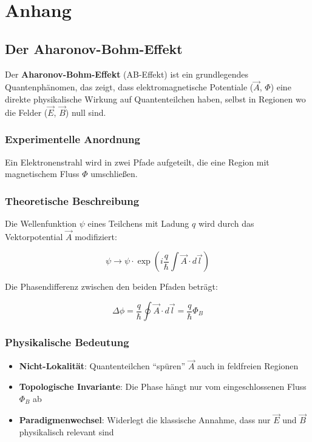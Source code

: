 \chapter{Anhang}
\section{Der Aharonov-Bohm-Effekt}
\label{sec:aharonov-bohm}

Der \textbf{Aharonov-Bohm-Effekt} (AB-Effekt) ist ein grundlegendes Quantenphänomen, das zeigt, dass elektromagnetische Potentiale ($\vec{A}$, $\Phi$) eine direkte physikalische
Wirkung auf Quantenteilchen haben, selbst in Regionen wo die Felder ($\vec{E}$, $\vec{B}$) null sind.

\subsection{Experimentelle Anordnung}
Ein Elektronenstrahl wird in zwei Pfade aufgeteilt, die eine Region mit magnetischem Fluss $\Phi$ umschließen.

\subsection{Theoretische Beschreibung}
Die Wellenfunktion $\psi$ eines Teilchens mit Ladung $q$ wird durch das Vektorpotential $\vec{A}$ modifiziert:

\begin{equation}
\psi \rightarrow \psi \cdot \exp\left(i\frac{q}{\hbar}\int \vec{A}\cdot d\vec{l}\right)
\end{equation}

Die Phasendifferenz zwischen den beiden Pfaden beträgt:

\begin{equation}
\Delta\phi = \frac{q}{\hbar}\oint \vec{A}\cdot d\vec{l} = \frac{q}{\hbar}\Phi_B
\end{equation}

\subsection{Physikalische Bedeutung}
\begin{itemize}
\item \textbf{Nicht-Lokalität}: Quantenteilchen \enquote{spüren} $\vec{A}$ auch in feldfreien Regionen
\item \textbf{Topologische Invariante}: Die Phase hängt nur vom eingeschlossenen Fluss $\Phi_B$ ab
\item \textbf{Paradigmenwechsel}: Widerlegt die klassische Annahme, dass nur $\vec{E}$ und $\vec{B}$ physikalisch relevant sind
\end{itemize}

